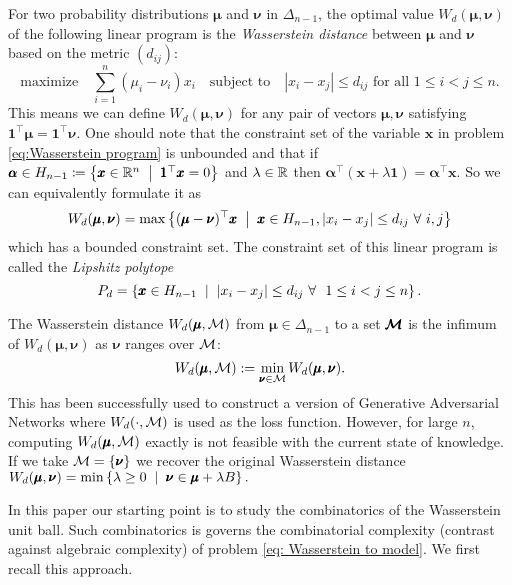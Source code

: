 For two probability distributions $\pmb \mu$ and $\pmb \nu$ in
$\Delta_{n-1}$, the optimal value $W_d(\pmb \mu,\pmb \nu)$ of the following linear program is the {\it Wasserstein distance} between $\pmb\mu$ and $\pmb\nu$ based on the metric $(d_{ij})$:
\begin{equation} \label{eq:Wasserstein program}
\mbox{maximize} \quad \sum_{i=1}^n (\mu_i - \nu_i)x_i \quad \mbox{subject to} \quad |x_i -
x_j| \leq d_{ij} \,\, \mbox{for all} \,\, 1 \leq i < j \leq n.
\end{equation}
This means we can define $W_{d}(\pmb\mu,\pmb\nu)$ for any pair of vectors $\pmb\mu,\pmb\nu$ satisfying $\pmb 1^{\top}\pmb\mu=\pmb1^{\top}\pmb\nu$.
One should note that the constraint set of the variable $\pmb x$ in problem \ref{eq:Wasserstein program} is unbounded and that if $\pmb \alpha\in H_{n-1}\sett\set{\pmb x\in\R^{n}\st \pmb 1^{\top}\pmb x=0}$ and $\lambda\in\mathbb{R}$ then $\pmb \alpha^\top(\pmb x+\lambda\pmb 1) = \pmb \alpha^\top\pmb x$. So we can equivalently formulate it as $$W_{d}(\pmb \mu,\pmb\nu) = \max\set{(\pmb \mu - \pmb\nu)^\top\pmb x\st \pmb x\in H_{n-1}, \abs{x_i-x_j}\le d_{ij}\fa i,j}$$ which has a bounded constraint set. The constraint set of this linear program is called the \textit{Lipshitz polytope} $$ P_d = \set{ \pmb x \in H_{n-1} \st \abs{x_i - x_j} \leq d_{ij} \fa~ 1 \leq i < j \leq n } .$$ 


The Wasserstein distance $W_d(\pmb\mu,{\mathcal{M}})$ from $\pmb\mu \in \Delta_{n-1}$ to a set $\pmb{{\mathcal{M}}}$ is the infimum of $W_d(\pmb\mu,\pmb\nu)$ as $\pmb\nu$ ranges over ${\mathcal{M}}$: 
\begin{equation} \label{eq: Wasserstein to model}
W_d(\pmb\mu, {\mathcal{M}}) := \min_{\pmb\nu\in {\mathcal{M}}} W_d(\pmb\mu, \pmb\nu).  
\end{equation}
This has been successfully used to construct a version of Generative Adversarial Networks \cite{WGAN17} where $W_d(\cdot, {\mathcal{M}})$ is used as the loss function. However, for large $n$, computing $W_d(\pmb\mu, {\mathcal{M}})$ exactly is not feasible with the current state of knowledge. If we take ${\mathcal{M}}=\left\{\pmb\nu\right\}$ we recover the original Wasserstein distance $W_d(\pmb \mu,\pmb \nu) = \min \set{\lambda \geq 0 \st \pmb \nu \in \pmb \mu + \lambda B }.$

In this paper our starting point is \cite{Wasserstein2,ccelik2021wasserstein} to study the combinatorics of the Wasserstein unit ball. Such combinatorics is governs the combinatorial complexity (contrast against algebraic complexity) of problem \ref{eq: Wasserstein to model}. We first recall this approach. 

